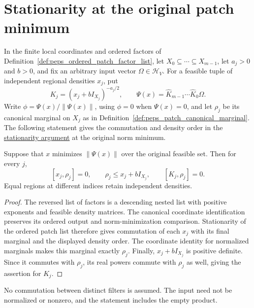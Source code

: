 \section{Stationarity at the original patch minimum}
\label{sec:peps_regularized_patch_minimizer_stationarity}

In the finite local coordinates and ordered factors of
Definition~\ref{def:peps_ordered_patch_factor_list}, let
$X_0\subseteq\cdots\subseteq X_{m-1}$, let $a_j>0$ and $b>0$, and
fix an arbitrary input vector $\Omega\in\mathcal H_V$.
For a feasible tuple of independent regional densities $x_j$, put
\[
    K_j=(x_j+bI_{X_j})^{-a_j/2},\qquad
    \Psi(x)=\widehat K_{m-1}\cdots\widehat K_0\Omega.
\]
Write $\phi=\Psi(x)/\|\Psi(x)\|$, using $\phi=0$ when $\Psi(x)=0$, and
let $\rho_j$ be its canonical marginal on $X_j$ as in
Definition~\ref{def:peps_patch_canonical_marginal}.
The following statement gives the commutation and density order in the
\href{https://github.com/openai/math/blob/adc7f1241b42e322a6451854ab7e4b4c146bf78a/preprints/Polynomial-PEPS-approximation-of-gapped-square-grid-ground-states-September-24-2026/build/sections/03-patches.tex\#L130-L205}{stationarity argument}
at the original norm minimum.

\begin{lemma}
    \label{thm:peps_actual_patch_minimum_stationarity}
    \leanok
    Suppose that $x$ minimizes $\|\Psi(x)\|$ over the original feasible set.
    Then for every $j$,
    \[
        [x_j,\rho_j]=0,\qquad
        \rho_j\le x_j+bI_{X_j},\qquad
        [K_j,\rho_j]=0.
    \]
    Equal regions at different indices retain independent densities.
\end{lemma}
\begin{proof}
    \leanok
    The reversed list of factors is a descending nested list with positive
    exponents and feasible density matrices. The canonical coordinate
    identification preserves its ordered output and norm-minimization
    comparison. Stationarity of the ordered patch list therefore gives
    commutation of each $x_j$ with its final marginal and the displayed
    density order. The coordinate identity for normalized marginals makes
    this marginal exactly $\rho_j$. Finally, $x_j+bI_{X_j}$ is positive
    definite. Since it commutes with $\rho_j$, its real powers commute
    with $\rho_j$ as well, giving the assertion for $K_j$.
\end{proof}

No commutation between distinct filters is assumed. The input need not be
normalized or nonzero, and the statement includes the empty product.
